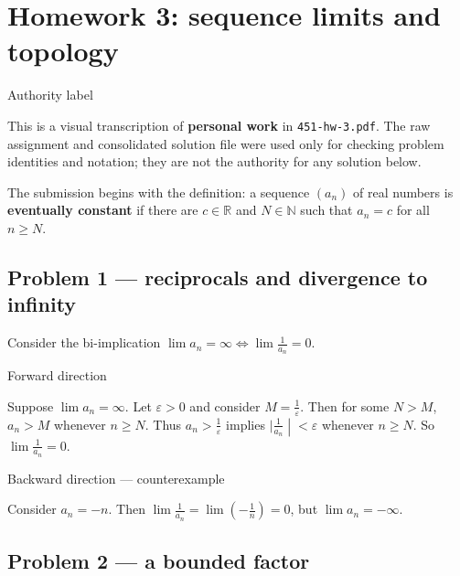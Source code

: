 \chapter{Homework 3: sequence limits and topology}

\begin{qlremark}{Authority label}

This is a visual transcription of \textbf{personal work} in \texttt{451-hw-3.pdf}. The raw assignment and consolidated solution file were used only for checking problem identities and notation; they are not the authority for any solution below.

\end{qlremark}

The submission begins with the definition: a sequence \(\left( a_{n} \right)\) of real numbers is \textbf{eventually constant} if there are \(c \in \mathbb{R}\) and \(N \in \mathbb{N}\) such that \(a_{n} = c\) for all \(n \geq N\).

\section{Problem 1 --- reciprocals and divergence to infinity}

Consider the bi-implication \(\lim a_{n} = \infty\Leftrightarrow\lim\frac{1}{a_{n}} = 0\).

\begin{qlsolution}{Forward direction}

Suppose \(\lim a_{n} = \infty\). Let \(\varepsilon > 0\) and consider \(M = \frac{1}{\varepsilon}\). Then for some \(N > M\), \(a_{n} > M\) whenever \(n \geq N\). Thus \(a_{n} > \frac{1}{\varepsilon}\) implies \(\left. |\frac{1}{a_{n}} \middle| < \varepsilon \right.\) whenever \(n \geq N\). So \(\lim\frac{1}{a_{n}} = 0\).

\end{qlsolution}

\begin{qlsolution}{Backward direction --- counterexample}

Consider \(a_{n} = - n\). Then \(\lim\frac{1}{a_{n}} = \lim\left( {- \frac{1}{n}} \right) = 0\), but \(\lim a_{n} = - \infty\).

\end{qlsolution}

\section{Problem 2 --- a bounded factor}


